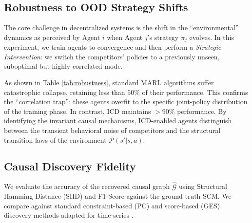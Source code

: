 \subsection{Robustness to OOD Strategy Shifts}
The core challenge in decentralized systems is the shift in the ``environmental'' dynamics as perceived by Agent $i$ when Agent $j$'s strategy $\pi_j$ evolves. In this experiment, we train agents to convergence and then perform a \textit{Strategic Intervention}: we switch the competitors' policies to a previously unseen, suboptimal but highly correlated mode.

\begin{table}[h]
\centering
\caption{Equilibrium Robustness across different environments. Metrics denote the percentage of cumulative reward (Return) retained after a $30\%$ shift in competitor strategy distributions. Values are Mean $\pm$ Std Dev over 10 random seeds.}
\label{tab:robustness}
%
\end{table}

As shown in Table \ref{tab:robustness}, standard MARL algorithms suffer catastrophic collapse, retaining less than $50\%$ of their performance. This confirms the ``correlation trap'': these agents overfit to the specific joint-policy distribution of the training phase. In contrast, ICD maintains $>90\%$ performance. By identifying the invariant causal mechanisms, ICD-enabled agents distinguish between the transient behavioral noise of competitors and the structural transition laws of the environment $\mathcal{P}(s'|s, a)$.

\subsection{Causal Discovery Fidelity}
We evaluate the accuracy of the recovered causal graph $\hat{\mathcal{G}}$ using Structural Hamming Distance (SHD) and F1-Score against the ground-truth SCM. We compare against standard constraint-based (PC) and score-based (GES) discovery methods adapted for time-series \cite{pearl2009causality}.


